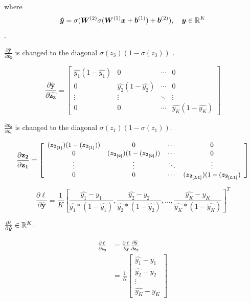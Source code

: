 where $$\bm{\hat{y}} = \sigma(\bm{W}^{(2)}\sigma(\bm{W}^{(1)}\bm{x} + \bm{b}^{(1)}) + \bm{b}^{(2)}), \quad \bm{y} \in \mathbb{R}^{K}$$.

$\frac{\partial \bm{\hat{y}}}{\partial \bm{z_3}}$ is changed to the diagonal $\sigma({z_3}) (1 - \sigma({z_3}))$ .


\begin{equation}
    \frac{\partial \mathbf{\hat{y}}}{\partial \mathbf{\hat{z_3}}}
    =
    \left[
        \begin{array}{cccc}
            { \hat{y_1}(1 - {\hat{y_1}}) } & 0 & \cdots & 0 \\
            0 & { \hat{y_2}(1 - {\hat{y_2}}) } & \cdots & 0 \\
            \vdots & \vdots & \ddots & \vdots \\
            0 & 0 & \cdots & { \hat{y_K}(1 - {\hat{y_K}}) }
        \end{array}
    \right]
\end{equation}


$\frac{\partial \bm{z_2}}{\partial \bm{z_1}}$ is changed to the diagonal $\sigma({z_1}) (1 - \sigma({z_1}))$.

\begin{equation}
    \frac{\partial \mathbf{z_2}}{\partial \mathbf{z_1}}
    = 
    \left[
        \small
        \begin{array}{cccc}
            (\bm{z_{2_{[1]}}}) (1 - (\bm{z_{2_{[1]}}}))& 0 & \cdots & 0 \\
            0 & (\bm{z_{2_{[2]}}}) (1 - (\bm{z_{2_{[2]}}})) & \cdots & 0 \\
            \vdots & \vdots & \ddots & \vdots \\
            0 & 0 & \cdots & (\bm{z_{2_{[L1]}}}) (1 - (\bm{z_{2_{[L1]}}})
        \end{array}
    \right]
\end{equation}


\begin{equation}
    \frac{\partial \ell}{\partial \bm{\hat y}}
     = \frac{1}{K} [\frac{{\hat{y_1} - {y_1}}}{ {\hat{y_1}} * (1 - {\hat{y_1}})}, \frac{{\hat{y_2} - {y_2}}}{ {\hat{y_2}} * (1 - {\hat{y_2}})}, ... , \frac{{\hat{y_K} - {y_K}}}{ {\hat{y_K}} * (1 - {\hat{y_K}})}]^T
\end{equation}

$\frac{\partial \ell}{\partial \bm{\hat y}} \in \mathbb{R}^{K}$.


\begin{align}
    \frac{\partial \ell}{\partial \bm{z_3}} 
    &= \frac{\partial \ell}{\partial \bm{\hat y}} \frac{\partial \bm{\hat y}}{\partial \bm{z_3}}          \\
    &=\frac{1}{K}\left[
        \begin{array}{c}
            \hat{y_1} - y_1 \\
            \hat{y_2} - y_2 \\
            \vdots   \\
            \hat{y_K} - y_K
        \end{array}
    \right]
\end{align}

